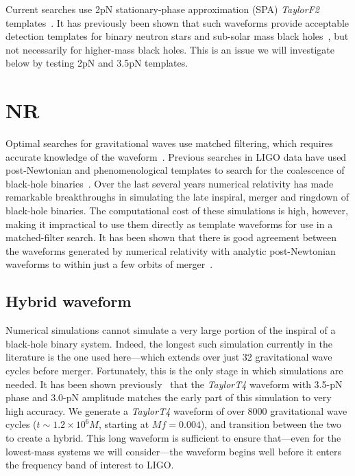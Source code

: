 Current searches use 2pN stationary-phase approximation (SPA)
\textit{TaylorF2} templates~\cite{Abbott:2008}.  It has previously
been shown that such waveforms provide acceptable detection templates
for binary neutron stars and sub-solar mass black
holes~\cite{Droz:1999qx}, but not necessarily for higher-mass black
holes.  This is an issue we will investigate below by testing 2pN and
3.5pN templates.



\section{NR}
Optimal searches for gravitational waves use matched filtering, which
requires accurate knowledge of the waveform~\cite{thorne.k:1987}.
Previous searches in LIGO data have used post-Newtonian and
phenomenological templates to search for the coalescence of black-hole
binaries~\cite{Abbott:2005pf,Abbott:2007xi,Abbott:2008}. Over the last
several years numerical relativity has made remarkable breakthroughs
in simulating the late inspiral, merger and ringdown of black-hole
binaries. The computational cost of these simulations is high,
however, making it impractical to use them directly as template
waveforms for use in a matched-filter search. It has been shown that
there is good agreement between the waveforms generated by numerical
relativity with analytic post-Newtonian waveforms to within just a few
orbits of merger~\cite{Buonanno-Cook-Pretorius:2007, Baker2006d,
  Pan2007, Buonanno2007, Hannam2007, Boyle2007, Gopakumar:2007vh,
  Hannam2007c, Boyle2008a, Mroue2008, Hinder2008b}.


\subsection{Hybrid waveform}
\label{sec:HybridWaveform} %
Numerical simulations cannot simulate a very large portion of the
inspiral of a black-hole binary system.  Indeed, the longest such
simulation currently in the literature is the one used here---which
extends over just 32 gravitational wave cycles before merger.
Fortunately, this is the only stage in which simulations are needed.
It has been shown previously~\cite{Boyle2007} that the
\textit{TaylorT4} waveform with 3.5-pN phase and 3.0-pN amplitude
matches the early part of this simulation to very high accuracy.  We
generate a \textit{TaylorT4} waveform of over 8000 gravitational wave
cycles ($t \sim 1.2\times 10^{6}M$, starting at $M f=0.004$), and
transition between the two to create a hybrid.  This long waveform is
sufficient to ensure that---even for the lowest-mass systems we will
consider---the waveform begins well before it enters the frequency
band of interest to LIGO.

